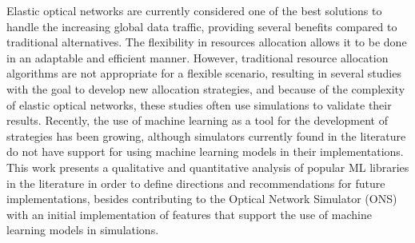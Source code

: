 Elastic optical networks are currently considered one of the best solutions to handle the increasing global data traffic, providing several benefits compared to traditional alternatives. The flexibility in resources allocation allows it to be done in an adaptable and efficient manner. However, traditional resource allocation algorithms are not appropriate for a flexible scenario, resulting in several studies with the goal to develop new allocation strategies, and because of the complexity of elastic optical networks, these studies often use simulations to validate their results. Recently, the use of machine learning as a tool for the development of strategies has been growing, although simulators currently found in the literature do not have support for using machine learning models in their implementations. This work presents a qualitative and quantitative analysis of popular ML libraries in the literature in order to define directions and recommendations for future implementations, besides contributing to the Optical Network Simulator (ONS) with an initial implementation of features that support the use of machine learning models in simulations.